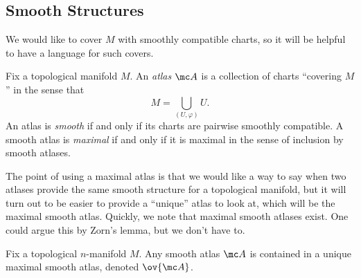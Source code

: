 \documentclass[../notes.tex]{subfiles}
\begin{document}
\subsection{Smooth Structures}
We would like to cover $M$ with smoothly compatible charts, so it will be helpful to have a language for such covers.
\begin{definition}[atlas]
	Fix a topological manifold $M$. An \textit{atlas} $\mc A$ is a collection of charts ``covering $M$'' in the sense that
	\[M=\bigcup_{(U,\varphi)}U.\]
	An atlas is \textit{smooth} if and only if its charts are pairwise smoothly compatible. A smooth atlas is \textit{maximal} if and only if it is maximal in the sense of inclusion by smooth atlases.
\end{definition}
The point of using a maximal atlas is that we would like a way to say when two atlases provide the same smooth structure for a topological manifold, but it will turn out to be easier to provide a ``unique'' atlas to look at, which will be the maximal smooth atlas. Quickly, we note that maximal smooth atlases exist. One could argue this by Zorn's lemma, but we don't have to.
\begin{proposition} \label{prop:get-max-smooth-atlas}
	Fix a topological $n$-manifold $M$. Any smooth atlas $\mc A$ is contained in a unique maximal smooth atlas, denoted $\ov{\mc A}$.
\end{proposition}
\end{document}

